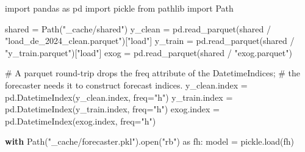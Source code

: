 \documentclass[
  english,
  letterpaper,
]{scrbook}
\newenvironment{Shaded}{\begin{snugshade}}{\end{snugshade}}
\newcommand{\BuiltInTok}[1]{\textcolor[rgb]{0.00,0.23,0.31}{#1}}
\newcommand{\CommentTok}[1]{\textcolor[rgb]{0.37,0.37,0.37}{#1}}
\newcommand{\ControlFlowTok}[1]{\textcolor[rgb]{0.00,0.23,0.31}{\textbf{#1}}}
\newcommand{\ImportTok}[1]{\textcolor[rgb]{0.00,0.46,0.62}{#1}}
\newcommand{\NormalTok}[1]{\textcolor[rgb]{0.00,0.23,0.31}{#1}}
\newcommand{\OperatorTok}[1]{\textcolor[rgb]{0.37,0.37,0.37}{#1}}
\newcommand{\StringTok}[1]{\textcolor[rgb]{0.13,0.47,0.30}{#1}}
\begin{document}
\protect{}\label{load-state-bt}
\begin{Shaded}
\begin{Highlighting}[]
\ImportTok{import}\NormalTok{ pandas }\ImportTok{as}\NormalTok{ pd}
\ImportTok{import}\NormalTok{ pickle}
\ImportTok{from}\NormalTok{ pathlib }\ImportTok{import}\NormalTok{ Path}

\NormalTok{shared }\OperatorTok{=}\NormalTok{ Path(}\StringTok{"\_cache/shared"}\NormalTok{)}
\NormalTok{y\_clean }\OperatorTok{=}\NormalTok{ pd.read\_parquet(shared }\OperatorTok{/} \StringTok{"load\_de\_2024\_clean.parquet"}\NormalTok{)[}\StringTok{"load"}\NormalTok{]}
\NormalTok{y\_train }\OperatorTok{=}\NormalTok{ pd.read\_parquet(shared }\OperatorTok{/} \StringTok{"y\_train.parquet"}\NormalTok{)[}\StringTok{"load"}\NormalTok{]}
\NormalTok{exog    }\OperatorTok{=}\NormalTok{ pd.read\_parquet(shared }\OperatorTok{/} \StringTok{"exog.parquet"}\NormalTok{)}

\CommentTok{\# A parquet round{-}trip drops the \textasciigrave{}freq\textasciigrave{} attribute of the DatetimeIndices;}
\CommentTok{\# the forecaster needs it to construct forecast indices.}
\NormalTok{y\_clean.index }\OperatorTok{=}\NormalTok{ pd.DatetimeIndex(y\_clean.index, freq}\OperatorTok{=}\StringTok{"h"}\NormalTok{)}
\NormalTok{y\_train.index }\OperatorTok{=}\NormalTok{ pd.DatetimeIndex(y\_train.index, freq}\OperatorTok{=}\StringTok{"h"}\NormalTok{)}
\NormalTok{exog.index    }\OperatorTok{=}\NormalTok{ pd.DatetimeIndex(exog.index, freq}\OperatorTok{=}\StringTok{"h"}\NormalTok{)}

\ControlFlowTok{with}\NormalTok{ Path(}\StringTok{"\_cache/forecaster.pkl"}\NormalTok{).}\BuiltInTok{open}\NormalTok{(}\StringTok{"rb"}\NormalTok{) }\ImportTok{as}\NormalTok{ fh:}
\NormalTok{    model }\OperatorTok{=}\NormalTok{ pickle.load(fh)}
\end{Highlighting}
\end{Shaded}
\end{document}
